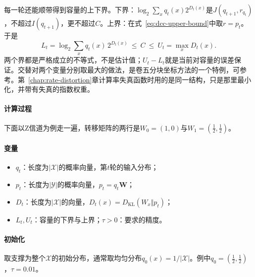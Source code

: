 每一轮还能顺带得到容量的上下界。下界：$\log_2\sum_xq_t(x)2^{D_t(x)}$是$J(q_{t+1},r_{q_t})$，不超过$I(q_{t+1})$，更不超过$C$。上界：在式~\eqref{eq:dcc-upper-bound}中取$r=p_t$。于是
\begin{equation}
 L_t=\log_2\sum_xq_t(x)\,2^{D_t(x)}\ \leq\ C\ \leq\ U_t=\max_xD_t(x) .
 \label{eq:dcc-ba-bounds}
\end{equation}
两个界都是严格成立的不等式，不是估计值；$U_t-L_t$就是当前对容量的误差保证。交替对两个变量分别取最大的做法，是卷五分块坐标方法的一个特例，可参考。第~\ref{chap:rate-distortion}章计算率失真函数时用的是同一结构，只是那里最小化，并带有失真的指数权重。

\paragraph{计算过程}
下面以Z信道为例走一遍，转移矩阵的两行是$W_0=(1,0)$与$W_1=(\tfrac12,\tfrac12)$。

\paragraph{变量}
\begin{itemize}
 \item $q_t$：长度为$\lvert\mathcal{X}\rvert$的概率向量，第$t$轮的输入分布；
 \item $p_t$：长度为$\lvert\mathcal{Y}\rvert$的概率向量，$p_t=q_t\bm{W}$；
 \item $D_t$：长度为$\lvert\mathcal{X}\rvert$的向量，$D_t(x)=D_{\mathrm{KL}}(W_x\Vert p_t)$；
 \item $L_t,U_t$：容量的下界与上界；$\tau>0$：要求的精度。
\end{itemize}

\paragraph{初始化}
取支撑为整个$\mathcal{X}$的初始分布，通常取均匀分布$q_0(x)=1/\lvert\mathcal{X}\rvert$。例中$q_0=(\tfrac12,\tfrac12)$，$\tau=0.01$。

